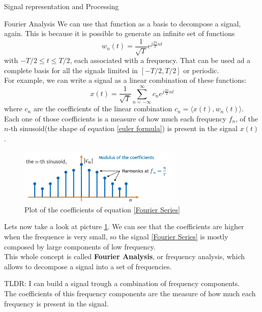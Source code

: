 \begin{section}{Signal representation and Processing}
\begin{subsection}{Fourier Analysis}
    We can use that function as a basis to decompose a signal, again. This is because it is 
    possible to generate an infinite set of functions
    \begin{equation}
      w_n(t) = \frac{1}{\sqrt{T}} e^{j\frac{2\pi}{T} nt} 
    \end{equation}
    with $-T/2 \leq t \leq T/2$, each associated with a frequency.
    That can be used ad a complete basis for all the signals limited in $[-T/2, T/2]$ or periodic.\\
    For example, we can write a signal as a linear combination of these functions:
    \begin{equation}
      x(t) = \frac{1}{\sqrt{T}} \sum_{n=-\infty}^{\infty} c_n e^{j\frac{2\pi}{T} nt}
      \label{Fourier Series}
    \end{equation}
    where $c_n$ are the coefficients of the linear combination $c_n = \langle x(t), w_n(t) \rangle$.\\
    Each one of those coefficients is a measure of how much each frequency $f_n$, of the $n$-th
    sinusoid(the shape of equation \ref{euler formula}) is present in the signal $x(t)$.\\
    \begin{figure}[h]
      \centering
      \includegraphics[width=0.7\textwidth]{img/wireless/euler plot.png}
      \caption{Plot of the coefficients of equation \ref{Fourier Series}}
      \label{fig:Fourier Analysis}
    \end{figure}
    Lets now take a look at picture \ref{fig:Fourier Analysis}. We can see that the coefficients
    are higher when the frequence is very small, so the signal \ref{Fourier Series} is mostly
    composed by large components of low frequency.\\
    This whole concept is called \textbf{Fourier Analysis}, or frequency analysis, which allows
    to decompose a signal into a set of frequencies.
    \begin{boxH}
    TLDR: I can build a signal trough a combination of frequency components. \\
    The coefficients of this frequency components are the measure of how much each frequency is 
    present in the signal.

\end{boxH}
\end{subsection}
\end{section}
